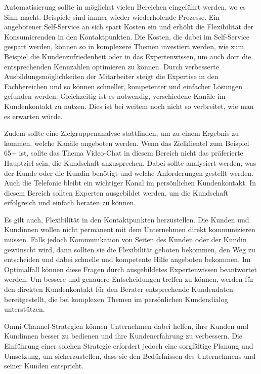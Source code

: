 Automatisierung sollte in möglichst vielen Bereichen eingeführt werden, wo es Sinn macht. Beispiele sind immer wieder wiederholende Prozesse. Ein angebotener Self-Service an sich spart Kosten ein und erhöht die Flexibilität der Konsumierenden in den Kontaktpunkten. Die Kosten, die dabei im Self-Service gespart werden, können so in komplexere Themen investiert werden, wie zum Beispiel die Kundenzufriedenheit oder in das Expertenwissen, um auch dort die entsprechenden Kennzahlen optimieren zu können. Durch verbesserte Ausbildungsmöglichkeiten der Mitarbeiter steigt die Expertise in den Fachbereichen und so können schneller, kompetenter und einfacher Lösungen gefunden werden. Gleichzeitig ist es notwendig, verschiedene Kanäle im Kundenkontakt zu nutzen. Dies ist bei weitem noch nicht so verbreitet, wie man es erwarten würde.
\newline

Zudem sollte eine Zielgruppenanalyse  stattfinden, um zu einem Ergebnis zu kommen, welche Kanäle angeboten werden. Wenn das Zielklientel zum Beispiel 65+ ist, sollte das Thema Video-Chat in diesem Bereich nicht das präferierte Hauptziel sein, die Kundschaft anzusprechen. Dabei sollte analysiert werden,  was der Kunde oder die Kundin benötigt und welche Anforderungen gestellt werden.
Auch die Telefonie bleibt ein wichtiger Kanal im persönlichen Kundenkontakt. In diesem Bereich sollten Experten ausgebildet werden, um die Kundschaft erfolgreich und einfach beraten zu können.
\newline

Es gilt auch, Flexibilität in den Kontaktpunkten herzustellen. Die Kunden und Kundinnen wollen nicht permanent mit dem Unternehmen direkt kommunizieren müssen. Falls  jedoch Kommunikation von Seiten des Kunden oder der Kundin gewünscht wird, dann sollten sie die Flexibilität geboten bekommen, den Weg zu entscheiden und dabei schnelle und kompetente Hilfe angeboten bekommen. Im Optimalfall können diese Fragen durch ausgebildetes Expertenwissen beantwortet werden. Um bessere und genauere Entscheidungen treffen zu können, werden für den direkten Kundenkontakt für den Berater entsprechende Kundendaten bereitgestellt, die bei komplexen Themen im persönlichen Kundendialog unterstützen.
\newline

Omni-Channel-Strategien können Unternehmen dabei helfen, ihre Kunden und Kundinnen besser zu bedienen und ihre Kundenerfahrung zu verbessern. Die Einführung einer solchen Strategie erfordert jedoch eine sorgfältige Planung und Umsetzung, um sicherzustellen, dass sie den Bedürfnissen des Unternehmens und seiner Kunden entspricht.
